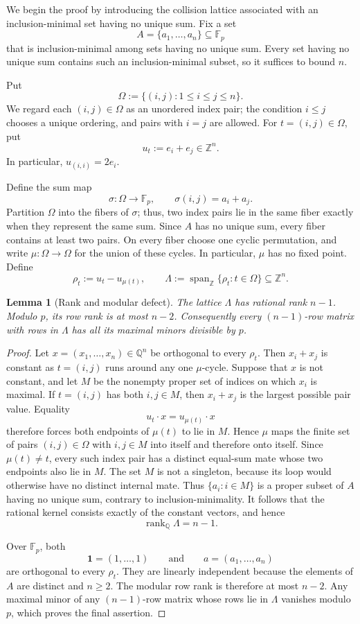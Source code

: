 \documentclass[10pt]{article}
\newtheorem{lemma}[theorem]{Lemma}
\theoremstyle{definition}
\begin{document}
We begin the proof by introducing the collision lattice associated with an
inclusion-minimal set having no unique sum.  Fix a set
\[
    A=\{a_1,\ldots,a_n\}\subseteq\mathbb F_p
\]
that is inclusion-minimal among sets having no unique sum.  Every set having
no unique sum contains such an inclusion-minimal subset, so it suffices to
bound $n$.

Put
\[
    \Omega:=\{(i,j):1\le i\le j\le n\}.
\]
We regard each $(i,j)\in\Omega$ as an unordered index pair; the condition
$i\le j$ chooses a unique ordering, and pairs with $i=j$ are allowed.  For
$t=(i,j)\in\Omega$, put
\[
    u_t:=e_i+e_j\in\mathbb Z^n.
\]
In particular, $u_{(i,i)}=2e_i$.

Define the sum map
\[
    \sigma:\Omega\longrightarrow\mathbb F_p,
    \qquad
    \sigma(i,j)=a_i+a_j.
\]
Partition $\Omega$ into the fibers of $\sigma$; thus, two index pairs lie in
the same fiber exactly when they represent the same sum.  Since $A$ has no
unique sum, every fiber contains at least two pairs.  On every fiber choose
one cyclic permutation, and write $\mu:\Omega\to\Omega$ for the union of
these cycles.  In particular, $\mu$ has no fixed point.  Define
\[
    \rho_t:=u_t-u_{\mu(t)},
    \qquad
    \Lambda:=\operatorname{span}_{\mathbb Z}
                  \{\rho_t:t\in\Omega\}\subseteq\mathbb Z^n.
\]

\begin{lemma}[Rank and modular defect]
The lattice $\Lambda$ has rational rank $n-1$.  Modulo $p$, its row rank is
at most $n-2$.  Consequently every $(n-1)$-row matrix with rows in
$\Lambda$ has all its maximal minors divisible by $p$.
\end{lemma}

\begin{proof}
Let $x=(x_1,\ldots,x_n)\in\mathbb Q^n$ be orthogonal to every $\rho_t$.
Then $x_i+x_j$ is constant as $t=(i,j)$ runs around any one
$\mu$-cycle.  Suppose that $x$ is not constant, and let $M$ be the nonempty
proper set of indices on which $x_i$ is maximal.  If $t=(i,j)$ has both
$i,j\in M$, then $x_i+x_j$ is the largest possible pair value.  Equality
\[
    u_t\cdot x=u_{\mu(t)}\cdot x
\]
therefore forces both endpoints of $\mu(t)$ to lie in $M$.  Hence $\mu$
maps the finite set of pairs $(i,j)\in\Omega$ with $i,j\in M$ into itself
and therefore onto itself.  Since $\mu(t)\ne t$, every such index pair has a
distinct equal-sum mate whose two endpoints also lie in $M$.  The set $M$
is not a singleton, because its loop would otherwise have no distinct
internal mate.  Thus $\{a_i:i\in M\}$ is a proper subset of $A$ having no
unique sum, contrary to inclusion-minimality.  It follows that the rational
kernel consists exactly of the constant vectors, and hence
\[
    \operatorname{rank}_{\mathbb Q}\Lambda=n-1.
\]

Over $\mathbb F_p$, both
\[
    \mathbf 1=(1,\ldots,1)
    \qquad\text{and}\qquad
    a=(a_1,\ldots,a_n)
\]
are orthogonal to every $\rho_t$.  They are linearly independent because
the elements of $A$ are distinct and $n\ge2$.  The modular row rank is
therefore at most $n-2$.  Any maximal minor of any $(n-1)$-row matrix whose
rows lie in $\Lambda$ vanishes modulo $p$, which proves the final assertion.
\end{proof}
\end{document}
